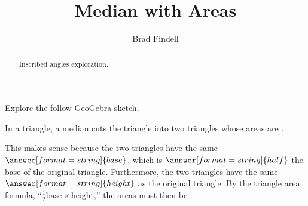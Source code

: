 \documentclass[handout,nooutcomes]{ximera}
\title{Median with Areas}
\author{Brad Findell}
\begin{document}
\begin{abstract}
Inscribed angles exploration. 
\end{abstract}
\maketitle




\begin{problem}
Explore the follow GeoGebra sketch.  
\begin{center}  
\end{center}
In a triangle, a median cuts the triangle into two triangles whose areas are .  

This makes sense because the two triangles have the same $\answer[format=string]{base}$, which is 
$\answer[format=string]{half}$ the base of the original triangle.  Furthermore, the two triangles have the same $\answer[format=string]{height}$ as the original triangle.  By the triangle area formula, ``$\frac{1}{2} \textrm{base} \times \textrm{height}$,'' the areas must then be .

\end{problem}
\end{document}

